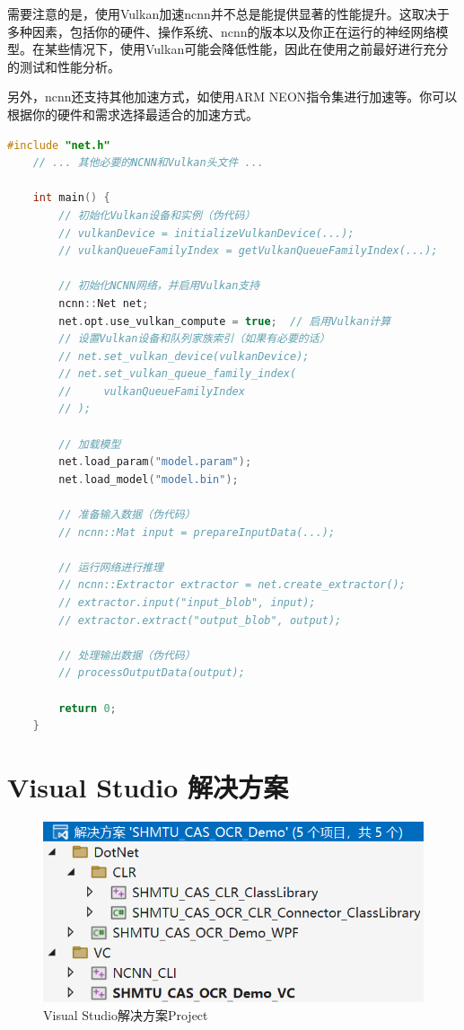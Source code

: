 	需要注意的是，使用Vulkan加速ncnn并不总是能提供显著的性能提升。这取决于多种因素，包括你的硬件、操作系统、ncnn的版本以及你正在运行的神经网络模型。在某些情况下，使用Vulkan可能会降低性能，因此在使用之前最好进行充分的测试和性能分析。

	另外，ncnn还支持其他加速方式，如使用ARM NEON指令集进行加速等。你可以根据你的硬件和需求选择最适合的加速方式。

  \begin{lstlisting}[caption={NCNN with Vulkan Initialization}, language=C++]
  	#include "net.h"
  	// ... 其他必要的NCNN和Vulkan头文件 ...

  	int main() {
  		// 初始化Vulkan设备和实例（伪代码）
  		// vulkanDevice = initializeVulkanDevice(...);
  		// vulkanQueueFamilyIndex = getVulkanQueueFamilyIndex(...);

  		// 初始化NCNN网络，并启用Vulkan支持
  		ncnn::Net net;
  		net.opt.use_vulkan_compute = true;  // 启用Vulkan计算
  		// 设置Vulkan设备和队列家族索引（如果有必要的话）
  		// net.set_vulkan_device(vulkanDevice);
  		// net.set_vulkan_queue_family_index(
  		//     vulkanQueueFamilyIndex
  		// );

  		// 加载模型
  		net.load_param("model.param");
  		net.load_model("model.bin");

  		// 准备输入数据（伪代码）
  		// ncnn::Mat input = prepareInputData(...);

  		// 运行网络进行推理
  		// ncnn::Extractor extractor = net.create_extractor();
  		// extractor.input("input_blob", input);
  		// extractor.extract("output_blob", output);

  		// 处理输出数据（伪代码）
  		// processOutputData(output);

  		return 0;
  	}
  \end{lstlisting}

\section{Visual Studio 解决方案}

\begin{figure}
	\centering
	\includegraphics[width=0.7\linewidth]{Resources/Picture/vs}
	\caption{Visual Studio解决方案Project}
	\label{fig:vs}
\end{figure}

